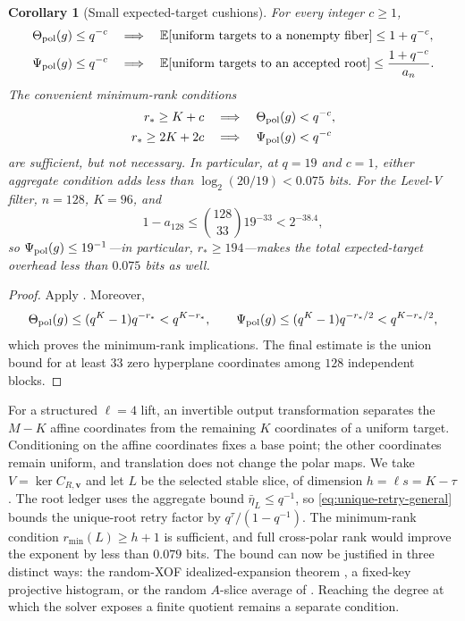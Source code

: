 \documentclass[11pt]{article}
\newtheorem{corollary}[corollary]{Corollary}
\begin{document}
\begin{corollary}[Small expected-target cushions]\label{cor:target-cushions}
For every integer $c\ge1$,
\begin{align}
 \Theta_{\rm pol}(g)\le q^{-c}
 &\quad\Longrightarrow\quad
 \mathbb E[\textnormal{uniform targets to a nonempty fiber}]
 \le1+q^{-c},\label{eq:full-space-spectrum-cushion}\\
 \Psi_{\rm pol}(g)\le q^{-c}
 &\quad\Longrightarrow\quad
 \mathbb E[\textnormal{uniform targets to an accepted root}]
 \le \frac{1+q^{-c}}{a_n}.
 \label{eq:filter-spectrum-cushion}
\end{align}
The convenient minimum-rank conditions
\begin{align}
 r_*\ge K+c
 &\quad\Longrightarrow\quad \Theta_{\rm pol}(g)<q^{-c},
 \label{eq:full-space-small-cushion}\\
 r_*\ge2K+2c
 &\quad\Longrightarrow\quad \Psi_{\rm pol}(g)<q^{-c}
 \label{eq:filter-small-cushion}
\end{align}
are sufficient, but not necessary.
In particular, at $q=19$ and $c=1$, either aggregate condition adds less than
$\log_2(20/19)<0.075$ bits.  For the Level-V filter,
$n=128$, $K=96$, and
\[
 1-a_{128}\le\binom{128}{33}19^{-33}<2^{-38.4},
\]
so $\Psi_{\rm pol}(g)\le19^{-1}$---in particular, $r_*\ge194$---makes the
total expected-target overhead less than $0.075$ bits as well.
\end{corollary}

\begin{proof}
Apply .  Moreover,
\[
 \Theta_{\rm pol}(g)
 \le(q^K-1)q^{-r_*}<q^{K-r_*},
 \qquad
 \Psi_{\rm pol}(g)
 \le(q^K-1)q^{-r_*/2}<q^{K-r_*/2},
\]
which proves the minimum-rank implications.  The final estimate is the union
bound for at least $33$ zero hyperplane coordinates among $128$ independent
blocks.
\end{proof}

For a structured $\ell=4$ lift, an invertible output transformation separates
the $M-K$ affine coordinates from the remaining $K$ coordinates of a uniform
target.  Conditioning on the affine coordinates fixes a base point; the other
coordinates remain uniform, and translation does not change the polar maps.
We take $V=\ker C_{R,\mathbf v}$ and let $L$ be the selected stable slice, of dimension
$h=\ell s=K-\tau$.  The root ledger uses the aggregate bound
$\bar\eta_L\le q^{-1}$, so \eqref{eq:unique-retry-general} bounds the
unique-root retry factor by $q^\tau/(1-q^{-1})$.  The minimum-rank condition
$r_{\min}(L)\ge h+1$ is sufficient, and full cross-polar rank would improve
the exponent by less than $0.079$ bits.  The bound can now be justified in
three distinct ways: the random-XOF idealized-expansion theorem
, a fixed-key projective histogram, or the random
$A$-slice average of .  Reaching the degree at which
the solver exposes a finite quotient remains a separate condition.
\end{document}
